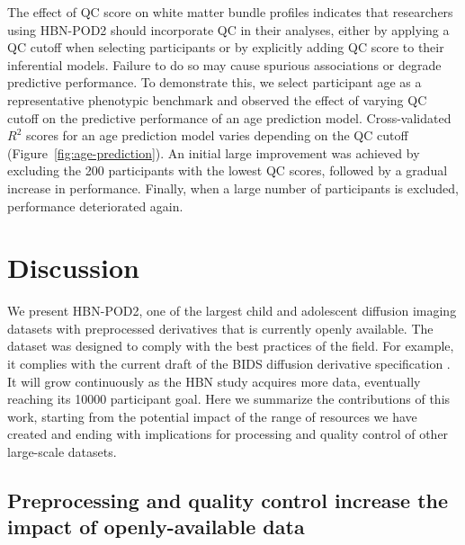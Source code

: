 \documentclass[9pt,lineno]{elife}
\begin{document}
The effect of QC score on white matter bundle profiles indicates that researchers
using HBN-POD2 should incorporate QC in their analyses, either by applying a QC cutoff
when selecting participants or by explicitly adding QC score to their inferential
models. Failure to do so may cause spurious associations or degrade predictive
performance. To demonstrate this, we select participant age as a representative
phenotypic benchmark \citep{cole2019brain,richie-halford2021multidimensional} and
observed the effect of varying QC cutoff on the predictive performance of an age
prediction model. Cross-validated $R^2$ scores for an age prediction model
varies depending on the QC cutoff (Figure~\ref{fig:age-prediction}). An initial large improvement was achieved by excluding the 200 participants with the lowest QC scores, followed by a gradual increase in performance. Finally, when a large number of participants is excluded, performance deteriorated again.

\section{Discussion}

We present HBN-POD2, one of the largest child and adolescent diffusion imaging
datasets with preprocessed derivatives that is currently openly available. The dataset
was designed to comply with the best practices of the field. For example, it
complies with the current draft of the BIDS diffusion derivative specification
\citep{Pestilli2021}. It will grow continuously as the HBN study acquires more
data, eventually reaching its \num{10000} participant goal. Here we summarize the
contributions of this work, starting from the potential impact of the range of
resources we have created and ending with implications for processing and
quality control of other large-scale datasets.

\subsection{Preprocessing and quality control increase the impact of openly-available data}
\end{document}
